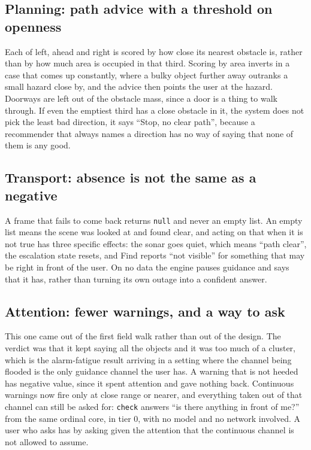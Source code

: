 \documentclass[sigconf,nonacm]{acmart}
\newcommand{\tool}[1]{\texttt{#1}}
\begin{document}
\subsection{Planning: path advice with a threshold on openness}

Each of left, ahead and right is scored by how close its nearest obstacle is,
rather than by how much area is occupied in that third. Scoring by area inverts
in a case that comes up constantly, where a bulky object further away outranks a
small hazard close by, and the advice then points the user at the hazard.
Doorways are left out of the obstacle mass, since a door is a thing to walk
through. If even the emptiest third has a close obstacle in it, the system does
not pick the least bad direction, it says ``Stop, no clear path'', because a
recommender that always names a direction has no way of saying that none of them
is any good.

\subsection{Transport: absence is not the same as a negative}

A frame that fails to come back returns \texttt{null} and never an empty list.
An empty list means the scene was looked at and found clear, and acting on that
when it is not true has three specific effects: the sonar goes quiet, which
means ``path clear'', the escalation state resets, and Find reports ``not
visible'' for something that may be right in front of the user. On no data the
engine pauses guidance and says that it has, rather than turning its own outage
into a confident answer.

\subsection{Attention: fewer warnings, and a way to ask}

This one came out of the first field walk rather than out of the design. The
verdict was that it kept saying all the objects and it was too much of a
cluster, which is the alarm-fatigue result \cite{sendelbach2013alarm,breznitz1984crywolf}
arriving in a setting where the channel being flooded is the only guidance
channel the user has. A warning that is not heeded has negative value, since it
spent attention and gave nothing back. Continuous warnings now fire only at
close range or nearer, and everything taken out of that channel can still be
asked for: \tool{check} answers ``is there anything in front of me?'' from the
same ordinal core, in tier 0, with no model and no network involved. A user who
asks has by asking given the attention that the continuous channel is not
allowed to assume.
\end{document}
